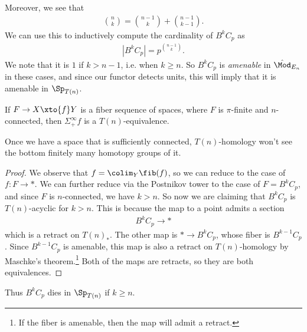 Moreover, we see that
\begin{align*}
    \binom{n}{k} = \binom{n-1}{k} + \binom{n-1}{k-1}.
\end{align*}
We can use this to inductively compute the cardinality of $B^k C_p$ as
\begin{align*}
    \left| B^k C_p \right| = p^{\binom{n-1}{k}}.
\end{align*}
We note that it is $1$ if $k >n-1$, i.e. when $k\ge n$. So $B^k C_p$ is \textit{amenable} in $\hat{\Mod}_{E_n}$ in these cases, and since our functor detects units, this will imply that it is amenable in $\Sp_{T(n)}$.

\begin{theorem} If $F \to X \xto{f} Y$ is a fiber sequence of spaces, where $F$ is $\pi$-finite and $n$-connected, then $\Sigma^\infty_+ f$ is a $T(n)$-equivalence.
\end{theorem}
Once we have a space that is sufficiently connected, $T(n)$-homology won't see the bottom finitely many homotopy groups of it.

\begin{proof} We observe that $f = \colim_Y \fib(f)$, so we can reduce to the case of $f: F \to \ast$. We can further reduce via the Postnikov tower to the case of $F = B^kC_p$, and since $F$ is $n$-connected, we have $k>n$. So now we are claiming that $B^k C_p$ is $T(n)$-acyclic for $k>n$. This is because the map to a point admits a section
\begin{align*}
    B^k C_p \to \ast
\end{align*}
which is a retract on $T(n)_\ast$. The other map is $\ast \to B^k C_p$, whose fiber is $B^{k-1}C_p$. Since $B^{k-1} C_p$ is amenable, this map is also a retract on $T(n)$-homology by Maschke's theorem.\footnote{If the fiber is amenable, then the map will admit a retract.} Both of the maps are retracts, so they are both equivalences.
\end{proof}

Thus $B^k C_p$ dies in $\Sp_{T(n)}$ if $k\ge n$.

